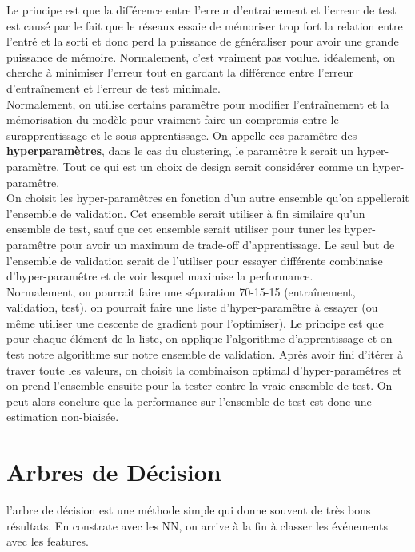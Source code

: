 \documentclass[oneside]{book}
\begin{document}
Le principe est que la différence entre l'erreur d'entrainement et l'erreur de test est causé par le fait que le réseaux essaie de mémoriser trop fort la relation entre l'entré et la sorti et donc perd la puissance de généraliser pour avoir une grande puissance de mémoire. Normalement, c'est vraiment pas voulue.  idéalement, on cherche à minimiser l'erreur tout en gardant la différence entre l'erreur d'entraînement et l'erreur de test minimale. \\

Normalement, on utilise certains paramêtre pour modifier l'entraînement et la mémorisation du modèle pour vraiment faire un compromis entre le surapprentissage et le sous-apprentissage. On appelle ces paramêtre des \textbf{hyperparamètres}, dans le cas du clustering, le paramêtre k serait un hyper-paramètre. Tout ce qui est un choix de design serait considérer comme un hyper-paramêtre.\\

On choisit les hyper-paramêtres en fonction d'un autre ensemble qu'on appellerait l'ensemble de validation. Cet ensemble serait utiliser à fin similaire qu'un ensemble de test, sauf que cet ensemble serait utiliser pour tuner les hyper-paramêtre pour avoir un maximum de trade-off d'apprentissage. Le seul but de l'ensemble de validation serait de l'utiliser pour essayer différente combinaise d'hyper-paramêtre et de voir lesquel maximise la performance.\\

Normalement, on pourrait faire une séparation 70-15-15 (entraînement, validation, test). on pourrait faire une liste d'hyper-paramêtre à essayer (ou même utiliser une descente de gradient pour l'optimiser). Le principe est que pour chaque élément de la liste, on applique l'algorithme d'apprentissage et  on test notre algorithme sur notre ensemble de validation. Après avoir fini d'itérer à traver toute les valeurs, on choisit la combinaison optimal d'hyper-paramêtres et on prend l'ensemble ensuite pour la tester contre la vraie ensemble de test. On peut alors conclure que la performance sur l'ensemble de test est donc une estimation non-biaisée.
\section{Arbres de Décision}
l'arbre de décision est une méthode simple qui donne souvent de très bons résultats. En constrate avec les NN, on arrive à la fin à classer les événements avec les features. \\
\end{document}
